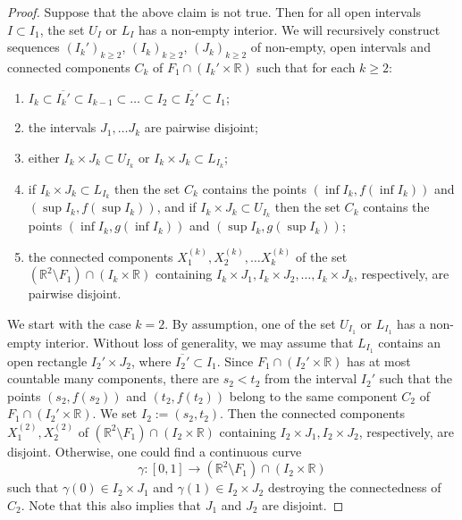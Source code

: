 \documentclass[a4paper,10pt]{amsart}
\newtheorem*{crucial lemma}{Lemma \ref{lem:nice polynomial2}}
\theoremstyle{definition}
\newcommand{\R}{\mathbb{R}}
\begin{document}
\begin{proof}
Suppose that the above claim is not true. Then for all open intervals $I\subset I_1$, the set $U_I$ or $L_I$ has a non-empty interior. 
We will recursively construct sequences $(I_k')_{k\geq2}$, $(I_k)_{k\geq2}$, $(J_k)_{k\geq2}$ of non-empty, open intervals and connected components $C_k$ of $F_1\cap(I_k'\times \R)$ such that for each $k\geq 2$:
\begin{enumerate}
    \item $I_{k}\subset \overline{I_{k}'}\subset I_{k-1}\subset \ldots\subset I_2\subset \overline{I_2'}\subset I_1$;
    \item the intervals $J_1,\ldots J_k$ are pairwise disjoint;
    \item either $I_k\times J_k\subset U_{I_k}$ or $I_k\times J_k\subset L_{I_k}$;
    \item if $I_k\times J_k\subset L_{I_k}$ then the set $C_k$ contains the points $(\inf I_k,f(\inf I_k))$ and $(\sup I_k,f(\sup I_k))$, and if $I_k\times J_k\subset U_{I_k}$ then the set $C_k$ contains the points $(\inf I_k,g(\inf I_k))$ and $(\sup I_k,g(\sup I_k))$;
    \item the connected components $X_1^{(k)},X_2^{(k)},\ldots X_k^{(k)}$ of the set $(\R^2\setminus F_1)\cap(I_k\times\R)$ containing $I_k\times J_1, I_k\times J_2,\ldots, I_k\times J_k$, respectively, are pairwise disjoint. 
\end{enumerate}

We start with the case $k=2$. By assumption, one of the set $U_{I_1}$ or $L_{I_1}$ has a non-empty interior. Without loss of generality, we may assume that $L_{I_1}$ contains an open rectangle $I_2'\times J_2$, where $\overline{I_2'}\subset I_1$. Since $F_1\cap(I_2'\times \R)$ has at most countable many components, there are $s_2<t_2$ from the interval $I_2'$ such that the points $(s_2,f(s_2))$ and $(t_2,f(t_2))$ belong to the same component $C_2$ of $F_1\cap(I_2'\times \R)$. We set $I_2:=(s_2,t_2)$. Then the connected components $X_1^{(2)},X_2^{(2)}$ of $(\R^2\setminus F_1)\cap(I_2\times\R)$ containing $I_2\times J_1, I_2\times J_2$, respectively, are disjoint. Otherwise, one could find a continuous curve 
\[\gamma\colon[0,1]\to (\R^2\setminus F_1)\cap (I_2\times\R)\]
such that $\gamma(0)\in I_2\times J_1$ and $\gamma(1)\in I_2\times J_2$ destroying the connectedness of $C_2$. Note that this also implies that $J_1$ and $J_2$ are disjoint.


\end{proof}
\end{document}
